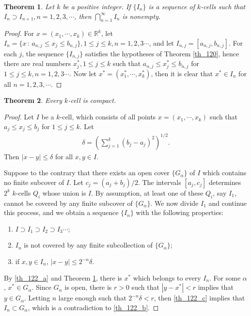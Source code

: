 \documentclass[10pt]{book}
\newtheorem{theorem}{Theorem}[chapter]
\theoremstyle{definition}
\numberwithin{equation}{chapter}
\begin{document}
\begin{theorem}\label{th_121}
Let $k$ be a positive integer. If $\{I_n\}$ is a sequence of $k$-cells such that $I_n \supset I_{n+1}, n = 1,2,3,\cdots$, then $\bigcap^\infty_{n=1} I_n$ is nonempty.
\end{theorem}
\begin{proof}
For $x = (x_1, \cdots, x_k) \in \mathbb{R}^k$, let $I_n = \{x \,:\, a_{n,j} \leq x_j \leq b_{n,j}\}, 1 \leq j \leq k, n = 1,2,3\cdots$, and let $I_{n,j} = [a_{n,j}, b_{n,j}]$. For each $j$, the sequence $\{I_{n,j}\}$ satisfies the hypotheses of Theorem \ref{th_120}, hence there are real numbers $x_j^*, 1 \leq j \leq k$ such that $a_{n,j} \leq x_j^* \leq b_{n,j}$ for $1 \leq j \leq k, n = 1,2,3\cdots$. Now let $x^* = (x_1^*,\cdots, x_k^*)$, then it is clear that $x^* \in I_n$ for all $n = 1,2,3,\cdots$.
\end{proof}

\medskip

\begin{theorem}\label{th_122}
Every $k$-cell is compact.
\end{theorem}
\begin{proof}
Let $I$ be a $k$-cell, which consists of all points $x = (x_1, \cdots, x_k)$ such that $a_j \leq x_j \leq b_j$ for $1 \leq j \leq k$. Let
\begin{align*}
    \delta = \left(\sum^k_{j=1} (b_j - a_j)^2\right)^{1/2}.
\end{align*}
Then $\left|x - y\right| \leq \delta$ for all $x,y \in I$.

Suppose to the contrary that there exists an open cover $\{G_{\alpha}\}$ of $I$ which contains no finite subcover of $I$. Let $c_j = (a_j + b_j)/2$. The intervals $[a_j, c_j]$ determines $2^k$ $k$-cells $Q_i$ whose union is $I$. By assumption, at least one of these $Q_i$, say $I_1$, cannot be covered by any finite subcover of $\{G_{\alpha}\}$. We now divide $I_1$ and continue this process, and we obtain a sequence $\{I_n\}$ with the following properties:
\begin{enumerate}[label=(\alph*)]
    \item $I \supset I_1 \supset I_2 \supset I_3 \cdots$; \label{th_122_a}
    
    \item $I_n$ is not covered by any finite subcollection of $\{G_{\alpha}\}$; \label{th_122_b}
    
    \item if $x,y \in I_n$, $\left|x - y\right| \leq 2^{-n} \delta$. \label{th_122_c}
\end{enumerate}
By \ref{th_122_a} and Theorem \ref{th_121}, there is $x^*$ which belongs to every $I_n$. For some $\alpha$, $x^* \in G_{\alpha}$. Since $G_{\alpha}$ is open, there is $r > 0$ such that $\left|y - x^*\right| < r$ implies that $y \in G_{\alpha}$. Letting $n$ large enough such  that $2^{-n}\delta < r$, then \ref{th_122_c} implies that $I_n \subset G_{\alpha}$, which is a contradiction to \ref{th_122_b}.
\end{proof}
\end{document}
